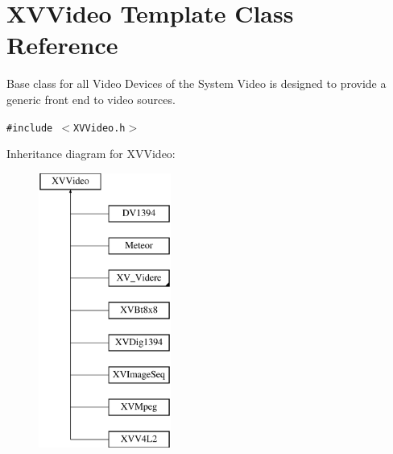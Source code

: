 \hypertarget{class_XVVideo}{
\section{XVVideo  Template Class Reference}
\label{XVVideo}
}
Base class for all Video Devices of the System Video is designed to provide a generic front end to video sources. 


{\tt \#include $<$XVVideo.h$>$}

Inheritance diagram for XVVideo:\begin{figure}[H]
\begin{center}
\leavevmode
\includegraphics[height=9cm]{class_XVVideo}
\end{center}
\end{figure}
